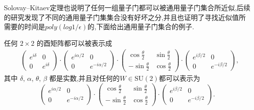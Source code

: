 Solovay–Kitaev定理也说明了任何一组量子门都可以被通用量子门集合所近似,后续的研究发现了不同的通用量子门集集合没有好坏之分,并且也证明了寻找近似值所需要的时间是$poly(log1/{\epsilon})$的\cite{48}\cite{49},下面给出通用量子门集合的例子.

\begin{example}
	任何 $2 \times 2$ 的酉矩阵都可以被表示成
	\begin{equation*}
		\begin{aligned}
			& \left(
			\begin{array}{cc}
				e^{i \delta} & 0 \\
				0        & e^{i \delta}
			\end{array}
			\right) \cdot
			\left(
			\begin{array}{cc}
				e^{i \alpha/2} & 0 \\
				0        & e^{-i \alpha/2}
			\end{array}
			\right) \cdot 
			\left(
			\begin{array}{cc}
				\cos \frac{\theta}{2} & \sin \frac{\theta}{2} \\
				-\sin \frac{\theta}{2} & \cos \frac{\theta}{2}
			\end{array}
			\right) \cdot
			\left(
			\begin{array}{cc}
				e^{i \beta/2} & 0 \\
				0        & e^{-i \beta/2}
			\end{array}
			\right),
		\end{aligned}
	\end{equation*}
	其中 $\delta$, $\alpha$, $\theta$, $\beta$ 都是实数,并且对任何的$W\in \mathrm{SU}(2)$都可以表示为
	\begin{equation*}
		\left(
		\begin{array}{cc}
			e^{i \alpha/2} & 0 \\
			0        & e^{-i \alpha/2}
		\end{array}
		\right) \cdot
		\left(
		\begin{array}{cc}
			\cos \frac{\theta}{2} & \sin \frac{\theta}{2} \\
			-\sin \frac{\theta}{2} & \cos \frac{\theta}{2}
		\end{array}
		\right) \cdot
		\left(
		\begin{array}{cc}
			e^{i \beta/2} & 0 \\
			0        & e^{-i \beta/2}
		\end{array}
		\right).
	\end{equation*}
\end{example}

